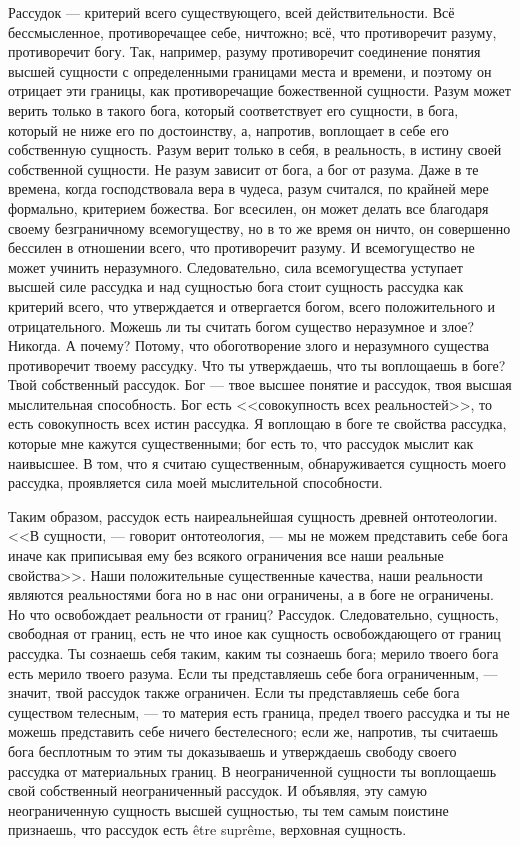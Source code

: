 \documentclass[12pt,oneside]{book}
\begin{document}
Рассудок --- критерий всего существующего, всей действительности. Всё бессмысленное, противоречащее себе, ничтожно; всё, что противоречит разуму, противоречит богу. Так, например, разуму противоречит соединение понятия высшей сущности с определенными границами места и времени, и поэтому он отрицает эти границы, как противоречащие божественной сущности. Разум может верить только в такого бога, который соответствует его сущности, в бога, который не ниже его по достоинству, а, напротив, воплощает в себе его собственную сущность. Разум верит только в себя, в реальность, в истину своей собственной сущности. Не разум зависит от бога, а бог от разума. Даже в те времена, когда господствовала вера в чудеса, разум считался, по крайней мере формально, критерием божества. Бог всесилен, он может делать все благодаря своему безграничному всемогуществу, но в то же время он ничто, он совершенно бессилен в отношении всего, что противоречит разуму. И всемогущество не может учинить неразумного. Следовательно, сила всемогущества уступает высшей силе рассудка и над сущностью бога стоит сущность рассудка как критерий всего, что утверждается и отвергается богом, всего положительного и отрицательного. Можешь ли ты считать богом существо неразумное и злое? Никогда. А почему? Потому, что обоготворение злого и неразумного существа противоречит твоему рассудку. Что ты утверждаешь, что ты воплощаешь в боге? Твой собственный рассудок. Бог --- твое высшее понятие и рассудок, твоя высшая мыслительная способность. Бог есть <<совокупность всех реальностей>>, то есть совокупность всех истин рассудка. Я воплощаю в боге те свойства рассудка, которые мне кажутся существенными; бог есть то, что рассудок мыслит как наивысшее. В том, что я считаю существенным, обнаруживается сущность моего рассудка, проявляется сила моей мыслительной способности.

Таким образом, рассудок есть наиреальнейшая сущность древней онтотеологии. <<В сущности, --- говорит онтотеология, --- мы не можем представить себе бога иначе как приписывая ему без всякого ограничения все наши реальные свойства>>\ddag\let\svthefootnote\thefootnote\let\thefootnote\relax{}\let\thefootnote\svthefootnote. Наши положительные существенные качества, наши реальности являются реальностями бога но в нас они ограничены, а в боге не ограничены. Но что освобождает реальности от границ? Рассудок. Следовательно, сущность, свободная от границ, есть не что иное как сущность освобождающего от границ рассудка. Ты сознаешь себя таким, каким ты сознаешь бога; мерило твоего бога есть мерило твоего разума. Если ты представляешь себе бога ограниченным, --- значит, твой рассудок также ограничен. Если ты представляешь себе бога существом телесным, --- то материя есть граница, предел твоего рассудка и ты не можешь представить себе ничего бестелесного; если же, напротив, ты считаешь бога бесплотным то этим ты доказываешь и утверждаешь свободу своего рассудка от материальных границ. В неограниченной сущности ты воплощаешь свой собственный неограниченный рассудок. И объявляя, эту самую неограниченную сущность высшей сущностью, ты тем самым поистине признаешь, что рассудок есть \^etre supr\^eme, верховная сущность.
\end{document}
